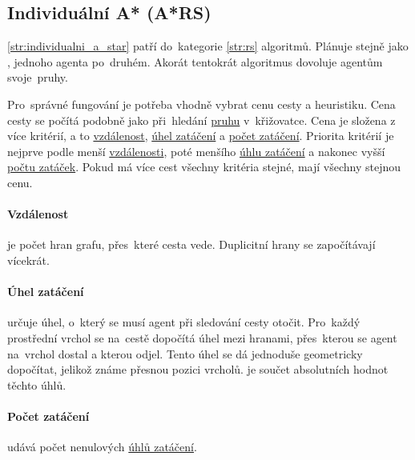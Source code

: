 \subsection{Individuální A* (A*RS)}\label{subsec:individualni_a_star}


\ref{str:individualni_a_star} patří do~kategorie \ref{str:rs} algoritmů.
Plánuje stejně jako , jednoho agenta po~druhém.
Akorát tentokrát algoritmus dovoluje agentům  svoje~pruhy.

Pro~správné fungování  je potřeba vhodně vybrat cenu cesty a heuristiku.
Cena cesty se počítá podobně jako při~hledání \hyperref[par:pruh]{pruhu} v~křižovatce.
Cena je složena z více kritérií, a to \hyperref[par:ars_vzdalenost]{vzdálenost},
\hyperref[par:ars_uhel_zataceni]{úhel zatáčení} a \hyperref[par:ars_pocet_zataceni]{počet zatáčení}.
Priorita kritérií je nejprve podle menší \hyperref[par:ars_vzdalenost]{vzdálenosti},
poté menšího \hyperref[par:ars_uhel_zataceni]{úhlu zatáčení}
a nakonec vyšší \hyperref[par:ars_pocet_zataceni]{počtu zatáček}.
Pokud má více cest všechny kritéria stejné, mají všechny stejnou cenu.

\paragraph{Vzdálenost}\label{par:ars_vzdalenost} je počet hran grafu, přes~které cesta vede.
Duplicitní hrany se započítávají vícekrát.

\paragraph{Úhel zatáčení}\label{par:ars_uhel_zataceni} určuje úhel, o~který se musí agent při sledování cesty otočit.
Pro~každý prostřední vrchol se na~cestě dopočítá úhel mezi hranami,
přes~kterou se agent na~vrchol dostal a kterou odjel.
Tento úhel se dá jednoduše geometricky dopočítat, jelikož známe přesnou pozici vrcholů.
 je součet absolutních hodnot těchto úhlů.

\paragraph{Počet zatáčení}\label{par:ars_pocet_zataceni} udává počet
nenulových \hyperref[par:ars_uhel_zataceni]{úhlů zatáčení}.

